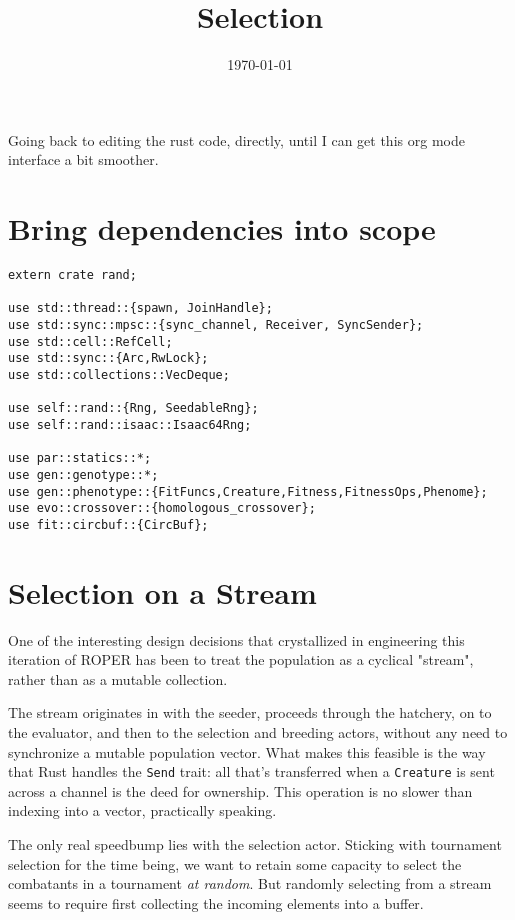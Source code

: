 \documentclass[11pt]{article}
\date{\today}
\title{Selection}
\begin{document}
\maketitle
\tableofcontents

Going back to editing the rust code, directly, until I can get
this org mode interface a bit smoother.

\section{Bring dependencies into scope}
\label{sec:org447a129}
\lstset{language=rust,label=org651eece,caption= ,captionpos=b,numbers=none}
\begin{lstlisting}
extern crate rand; 

use std::thread::{spawn, JoinHandle};
use std::sync::mpsc::{sync_channel, Receiver, SyncSender};
use std::cell::RefCell;
use std::sync::{Arc,RwLock}; 
use std::collections::VecDeque;

use self::rand::{Rng, SeedableRng};
use self::rand::isaac::Isaac64Rng;

use par::statics::*;
use gen::genotype::*;
use gen::phenotype::{FitFuncs,Creature,Fitness,FitnessOps,Phenome};
use evo::crossover::{homologous_crossover};
use fit::circbuf::{CircBuf};
\end{lstlisting}

\section{Selection on a Stream}
\label{sec:org179e7c1}

One of the interesting design decisions that crystallized in engineering
this iteration of ROPER has been to treat the population as a cyclical
"stream", rather than as a mutable collection. 

The stream originates in with the seeder, proceeds through the hatchery,
on to the evaluator, and then to the selection and breeding actors, without
any need to synchronize a mutable population vector. What makes this feasible
is the way that Rust handles the \texttt{Send} trait: all that's transferred when a
\texttt{Creature} is sent across a channel is the deed for ownership. This operation
is no slower than indexing into a vector, practically speaking. 

The only real speedbump lies with the selection actor. Sticking with tournament
selection for the time being, we want to retain some capacity to select the
combatants in a tournament \emph{at random}. But randomly selecting from a stream
seems to require first collecting the incoming elements into a buffer. 
\end{document}
